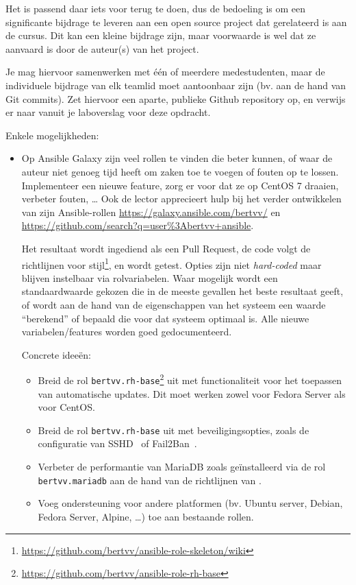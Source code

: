 Het is passend daar iets voor terug te doen, dus de bedoeling is om een significante bijdrage te leveren aan een open source project dat gerelateerd is aan de cursus. Dit kan een kleine bijdrage zijn, maar voorwaarde is wel dat ze aanvaard is door de auteur(s) van het project.

Je mag hiervoor samenwerken met één of meerdere medestudenten, maar de individuele bijdrage van elk teamlid moet aantoonbaar zijn (bv. aan de hand van Git commits). Zet hiervoor een aparte, publieke Github repository op, en verwijs er naar vanuit je laboverslag voor deze opdracht.

Enkele mogelijkheden:

\begin{itemize}
\item Op Ansible Galaxy zijn veel rollen te vinden die beter kunnen, of waar de auteur niet genoeg tijd heeft om zaken toe te voegen of fouten op te lossen. Implementeer een nieuwe feature, zorg er voor dat ze op CentOS 7 draaien, verbeter fouten, \ldots{} Ook de lector apprecieert hulp bij het verder ontwikkelen van zijn Ansible-rollen \url{https://galaxy.ansible.com/bertvv/} en \url{https://github.com/search?q=user\%3Abertvv+ansible}.

  Het resultaat wordt ingediend als een Pull Request, de code volgt de richtlijnen voor stijl\footnote{\url{https://github.com/bertvv/ansible-role-skeleton/wiki}}, en wordt getest. Opties zijn niet \emph{hard-coded} maar blijven instelbaar via rolvariabelen. Waar mogelijk wordt een standaardwaarde gekozen die in de meeste gevallen het beste resultaat geeft, of wordt aan de hand van de eigenschappen van het systeem een waarde ``berekend'' of bepaald die voor dat systeem optimaal is. Alle nieuwe variabelen/features worden goed gedocumenteerd.

  Concrete ideeën:

  \begin{itemize}
    \item Breid de rol \texttt{bertvv.rh-base}\footnote{\url{https://github.com/bertvv/ansible-role-rh-base}} uit met functionaliteit voor het toepassen van automatische updates. Dit moet werken zowel voor Fedora Server als voor CentOS.
    \item Breid de rol \texttt{bertvv.rh-base} uit met beveiligingsopties, zoals de configuratie van SSHD~\autocite{stribika2015,Moundalexis2016} of Fail2Ban~\autocite{Sawiyati2014}.
    \item Verbeter de performantie van MariaDB zoals geïnstalleerd via de rol \texttt{bertvv.mariadb} aan de hand van de richtlijnen van \textcite{Aun2016}.
    \item Voeg ondersteuning voor andere platformen (bv. Ubuntu server, Debian, Fedora Server, Alpine, \ldots) toe aan bestaande rollen.
  \end{itemize}


\end{itemize}
